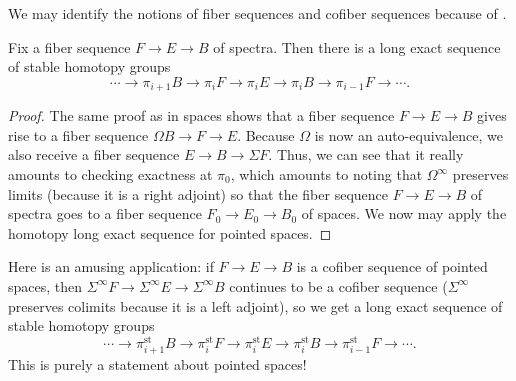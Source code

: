 \documentclass[../notes.tex]{subfiles}
\begin{document}
\begin{remark}
	We may identify the notions of fiber sequences and cofiber sequences because of .
\end{remark}
\begin{theorem}
	Fix a fiber sequence $F\to E\to B$ of spectra. Then there is a long exact sequence of stable homotopy groups
	\[\cdots\to\pi_{i+1}B\to\pi_iF\to\pi_iE\to\pi_iB\to\pi_{i-1}F\to\cdots.\]
\end{theorem}
\begin{proof}
	The same proof as in spaces shows that a fiber sequence $F\to E\to B$ gives rise to a fiber sequence $\Omega B\to F\to E$. Because $\Omega$ is now an auto-equivalence, we also receive a fiber sequence $E\to B\to\Sigma F$. Thus, we can see that it really amounts to checking exactness at $\pi_0$, which amounts to noting that $\Omega^\infty$ preserves limits (because it is a right adjoint) so that the fiber sequence $F\to E\to B$ of spectra goes to a fiber sequence $F_0\to E_0\to B_0$ of spaces. We now may apply the homotopy long exact sequence for pointed spaces.
\end{proof}
\begin{remark}
	Here is an amusing application: if $F\to E\to B$ is a cofiber sequence of pointed spaces, then $\Sigma^\infty F\to\Sigma^\infty E\to\Sigma^\infty B$ continues to be a cofiber sequence ($\Sigma^\infty$ preserves colimits because it is a left adjoint), so we get a long exact sequence of stable homotopy groups
	\[\cdots\to\pi_{i+1}^{\mathrm{st}}B\to\pi_i^{\mathrm{st}}F\to\pi_i^{\mathrm{st}}E\to\pi_i^{\mathrm{st}}B\to\pi_{i-1}^{\mathrm{st}}F\to\cdots.\]
	This is purely a statement about pointed spaces!
\end{remark}
\end{document}
